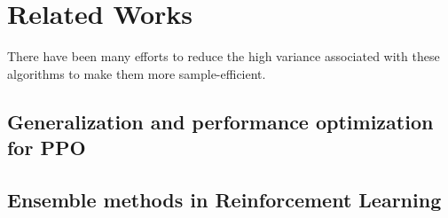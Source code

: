 \section{Related Works}
\label{sec:rw}

There have been many efforts to reduce the high variance associated with these algorithms to make them more sample-efficient.

\subsection{Generalization and performance optimization for PPO}

\subsection{Ensemble methods in Reinforcement Learning}